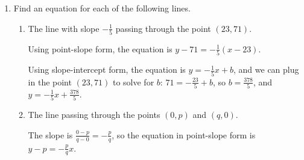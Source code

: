 \documentclass{article}
\begin{document}
\begin{enumerate}
\begin{enumerate}
  \item


    \begin{problem}[\vfill\newpage]
      If the item is priced at \$725, how many items will customers want to buy?
    \end{problem}

    \begin{solution}
      Based on our function, $q(725) = -4(725-750)+2200 = 2300$, so when the price per item
      is \$725, the quantity demanded will be 2300 units.
    \end{solution}

  \end{enumerate}

\item  Find an equation for each of the following lines.
  \begin{enumerate}

  \item
    \begin{problem}[\vfill]
      The line with slope $- \frac{1}{5}$ passing through the point $(23, 71)$. 
    \end{problem}

    \begin{solution}
      Using point-slope form, the equation is
      $\boxed{y - 71 = - \frac{1}{5} (x - 23)}$.

      Using slope-intercept form, the equation is
      $y = - \frac{1}{5} x + b$, and we can plug in the point $(23, 71)$
      to solve for $b$: $71 = -\frac{23}{5} + b$, so $b = \frac{378}{5}$, 
      and $\boxed{y = - \frac{1}{5} x + \frac{378}{5}}$. 
    \end{solution}

  \item
    \begin{problem}[\vfill]
      The line passing through the points $(0, p)$ and $(q, 0)$.
    \end{problem}

    \begin{solution}
      The slope is $\frac{0 - p}{q - 0} = - \frac{p}{q}$, 
      so the equation in point-slope form is
      $\boxed{y - p = - \frac{p}{q} x}$. 


\end{solution}
\end{enumerate}
\end{enumerate}
\end{document}
